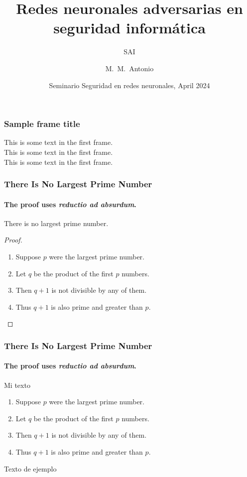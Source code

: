 \documentclass{beamer}
\title[SAI] %
{Redes neuronales adversarias en seguridad informática}
\subtitle{SAI}
\author[Antonio, Mudarra Machuca] %
{M.~M.~Antonio\inst{1}}
\institute[UJAEN] %
{
  \inst{1}%
  Sistemas Inteligentes y Minería de Datos\\
  Escuela Politécnica Superior de Jaén\\
  Universidad de Jaén
}
\date[SAI 2024] %
{Seminario Seguridad en redes neuronales, April 2024}
\begin{document}
\frame{\titlepage}

\begin{frame}
    \frametitle{Sample frame title}
    This is some text in the first frame. \\
    This is some text in the first frame. \\
    This is some text in the first frame.
\end{frame}

\begin{frame}
    \frametitle{There Is No Largest Prime Number}
    \framesubtitle{The proof uses \textit{reductio ad absurdum}.}
    \begin{theorem}
        There is no largest prime number.
    \end{theorem}
    \begin{proof}
        \begin{enumerate}
            \item<1-| alert@1> Suppose $p$ were the largest prime number.
            \item<2-> Let $q$ be the product of the first $p$ numbers.
            \item<3-> Then $q+1$ is not divisible by any of them.
            \item<1-> Thus $q+1$ is also prime and greater than $p$.\qedhere
        \end{enumerate}
    \end{proof}
\end{frame}


\begin{frame}
    \frametitle{There Is No Largest Prime Number}
    \framesubtitle{The proof uses \textit{reductio ad absurdum}.}

    \begin{block}{Mi texto}
        \begin{enumerate}
            \item<1-| alert@1> Suppose $p$ were the largest prime number.
            \item<2-> Let $q$ be the product of the first $p$ numbers.
            \item<3-> Then $q+1$ is not divisible by any of them.
            \item<4-> Thus $q+1$ is also prime and greater than $p$.\qedhere
        \end{enumerate}
    \end{block}

    \pause[4]
    \begin{example}
        Texto de ejemplo
    \end{example}
\end{frame}

\begin{frame}
    \centering
\end{frame}
\end{document}
